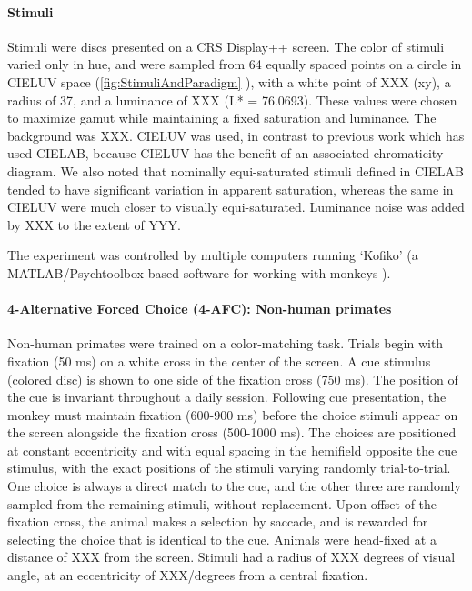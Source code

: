 \paragraph{Stimuli} 

Stimuli were discs presented on a CRS Display++ screen.
The color of stimuli varied only in hue, and were sampled from 64 equally spaced points on a circle in CIELUV space (\autoref{fig:StimuliAndParadigm}%
), with a white point of XXX (xy), a radius of 37, and a luminance of XXX (L* = 76.0693). 
These values were chosen to maximize gamut while maintaining a fixed saturation and luminance. 
The background was XXX.
CIELUV was used, in contrast to previous work which has used CIELAB, because CIELUV has the benefit of an associated chromaticity diagram. 
We also noted that nominally equi-saturated stimuli defined in CIELAB tended to have significant variation in apparent saturation, whereas the same in CIELUV were much closer to visually equi-saturated. 
Luminance noise was added by XXX to the extent of YYY.

The experiment was controlled by multiple computers running `Kofiko' (a MATLAB/Psychtoolbox based software for working with monkeys %
).

\paragraph{4-Alternative Forced Choice (4-AFC): Non-human primates} \label{para:4AFC}
Non-human primates were trained on a color-matching task. 
Trials begin with fixation (50 ms) on a white cross in the center of the screen. 
A cue stimulus (colored disc) is shown to one side of the fixation cross (750 ms). 
The position of the cue is invariant throughout a daily session. 
Following cue presentation, the monkey must maintain fixation (600-900 ms) before the choice stimuli appear on the screen alongside the fixation cross (500-1000 ms). 
The choices are positioned at constant eccentricity and with equal spacing in the hemifield opposite the cue stimulus, with the exact positions of the stimuli varying randomly trial-to-trial. 
One choice is always a direct match to the cue, and the other three are randomly sampled from the remaining stimuli, without replacement.
Upon offset of the fixation cross, the animal makes a selection by saccade, and is rewarded for selecting the choice that is identical to the cue. 
Animals were head-fixed at a distance of XXX from the screen. 
Stimuli had a radius of XXX degrees of visual angle, at an eccentricity of XXX/degrees from a central fixation.

